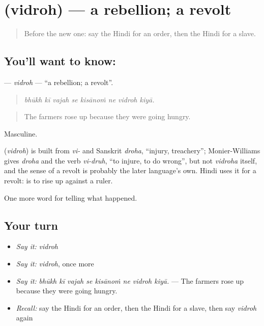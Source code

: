 \section[\texorpdfstring{\hi{विद्रोह} (vidroh)}{विद्रोह (vidroh)}]{ (vidroh) — a rebellion; a revolt}

\label{lesson:HI-C324-vidroh}



\begin{quote}
Before the new one: say the Hindi for an order, then the Hindi for a slave.
\end{quote}

\subsection*{You'll want to know: }
\textbf{} — \emph{vidroh} — \textquotedblleft{}a rebellion; a revolt\textquotedblright{}.

\begin{quote}
       
\end{quote}

\begin{quote}
\emph{bhūkh kī vajah se kisānoṁ ne vidroh kiyā.}
\end{quote}

\begin{quote}
The farmers rose up because they were going hungry.
\end{quote}

Masculine.

\begin{cousinweb}
\textbf{} (\emph{vidroh}) is built from \emph{vi-} and Sanskrit \emph{droha}, \textquotedblleft{}injury, treachery\textquotedblright{}; Monier-Williams gives \emph{droha} and the verb \emph{vi-druh}, \textquotedblleft{}to injure, to do wrong\textquotedblright{}, but not \emph{vidroha} itself, and the sense of a revolt is probably the later language's own. Hindi uses it for a revolt: \textbf{ } is to rise up against a ruler.
\end{cousinweb}

\begin{grammarlens}[title={What you've built}]
One more word for telling what happened.
\end{grammarlens}

\subsection*{Your turn}
\begin{itemize}
\raggedright
  \item \emph{Say it:} \emph{vidroh}
  \item \emph{Say it:} \emph{vidroh}, once more
  \item \emph{Say it:} \emph{bhūkh kī vajah se kisānoṁ ne vidroh kiyā.} — The farmers rose up because they were going hungry.
  \item \emph{Recall:} say the Hindi for an order, then the Hindi for a slave, then say \emph{vidroh} again
\end{itemize}

